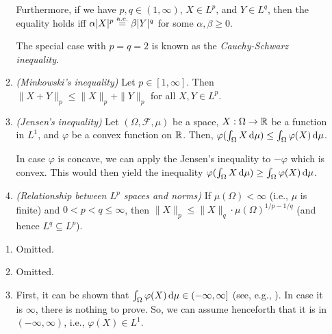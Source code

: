 \begin{enumerate}
\begin{enumerate}
Furthermore, if we have \(p,q\in (1,\infty)\), \(X\in L^{p}\), and \(Y\in
L^{q}\), then the equality holds iff \(\alpha|X|^{p}\overset{\text{a.e.}}= \beta|Y|^{q}\) for
some \(\alpha,\beta\ge 0\).

\begin{note}
The special case with \(p=q=2\) is known as the \emph{Cauchy-Schwarz
inequality}.
\end{note}
\item\label{it:minkowski-ineq} \emph{(Minkowski's inequality)} Let \(p\in [1,\infty]\). Then
\(\|X+Y\|_{p}\le \|X\|_{p}+\|Y\|_{p}\) for all \(X,Y\in L^{p}\).
\item\label{it:jensen-ineq} \emph{(Jensen's inequality)} Let
\((\Omega,\mathcal{F},\mu)\) be a  space, \(X:\Omega\to\mathbb{R}\) be
a function in \(L^{1}\), and \(\varphi\) be a convex function
on \(\mathbb{R}\). Then, \(\varphi(\int_{\Omega}^{}X\odif{\mu})\le
\int_{\Omega}^{}\varphi(X)\odif{\mu}\).
\begin{note}
In case \(\varphi\) is concave, we can apply the Jensen's inequality to
\(-\varphi\) which is convex. This would then yield the inequality
\(\varphi(\int_{\Omega}^{}X\odif{\mu})\ge
\int_{\Omega}^{}\varphi(X)\odif{\mu}\).
\end{note}
\item\label{it:lp-sp-norm-relate} \emph{(Relationship between \(L^{p}\) spaces
and norms)} If \(\mu(\Omega)<\infty\) (i.e., \(\mu\) is finite) and
\(0<p<q\le\infty\), then \(\|X\|_{p}\le
\|X\|_{q}\cdot \mu(\Omega)^{1/p-1/q}\) (and hence \(L^{q}\subseteq L^{p}\)).

\end{enumerate}
\begin{pf}
\begin{enumerate}
\item Omitted.
\item Omitted.
\item First, it can be shown that \(\int_{\Omega}^{}\varphi(X)\odif{\mu}\in
(-\infty,\infty]\) (see, e.g., \textcite[Theorem~7.9]{klenke2020probability}). In case it is \(\infty\), there is nothing to prove. So, we can assume henceforth that it is in \((-\infty,\infty)\), i.e., \(\varphi(X)\in L^{1}\).


\end{enumerate}
\end{pf}
\end{enumerate}
